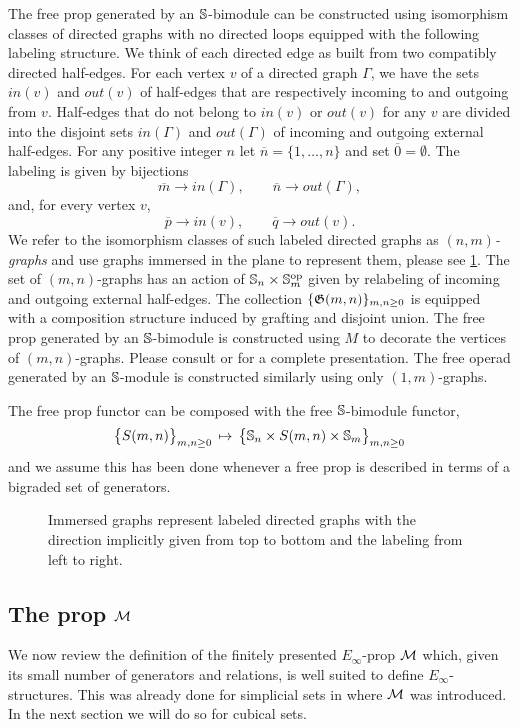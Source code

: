 The free prop generated by an $\S$-bimodule can be constructed using isomorphism classes of directed graphs with no directed loops equipped with the following labeling structure.
We think of each directed edge as built from two compatibly directed half-edges. For each vertex $v$ of a directed graph $\Gamma$, we have the sets $in(v)$ and $out(v)$ of half-edges that are respectively incoming to and outgoing from $v$. Half-edges that do not belong to $in(v)$ or $out(v)$ for any $v$ are divided into the disjoint sets $in(\Gamma)$ and $out(\Gamma)$ of incoming and outgoing external half-edges.
For any positive integer $n$ let $\overline{n} = \{1,\dots,n\}$ and set $\overline{0} = \emptyset$.
The labeling is given by bijections
\[
\overline{m} \to in(\Gamma), \qquad
\overline{n} \to out(\Gamma),
\]
and, for every vertex $v$,
\[
\overline{p} \to in(v), \qquad
\overline{q} \to out(v).
\]
We refer to the isomorphism classes of such labeled directed graphs as $(n,m)$\textit{-graphs} and use graphs immersed in the plane to represent them, please see \cref{f:immersion}.
The set of $(m,n)$-graphs has an action of $\S_n \times \S_m^{\op}$ given by relabeling of incoming and outgoing external half-edges.
The collection $\{\G(m,n)\}_{m,n \geq 0}$ is equipped with a composition structure induced by grafting and disjoint union.
The free prop generated by an $\S$-bimodule is constructed using $M$ to decorate the vertices of $(m,n)$-graphs.
Please consult \cite{markl2008props} or \cite{fresse2010props} for a complete presentation.
The free operad generated by an $\S$-module is constructed similarly using only $(1,m)$-graphs.

The free prop functor can be composed with the free $\S$-bimodule functor,
\[
\big\{ S(m,n) \big\}_{m,n \geq 0} \, \mapsto \, \big\{ \S_n \times S(m,n) \times \S_m \big\}_{m,n \geq 0}
\]
and we assume this has been done whenever a free prop is described in terms of a bigraded set of generators.

\begin{figure}
	
	\caption{Immersed graphs represent labeled directed graphs with the direction implicitly given from top to bottom and the labeling from left to right.}
	\label{f:immersion}
\end{figure}

\subsection{The prop $\M$}

We now review the definition of the finitely presented $E_\infty$-prop $\M$ which, given its small number of generators and relations, is well suited to define $E_\infty$-structures.
This was already done for simplicial sets in \cite{medina2020prop1} where $\M$ was introduced.
In the next section we will do so for cubical sets.

